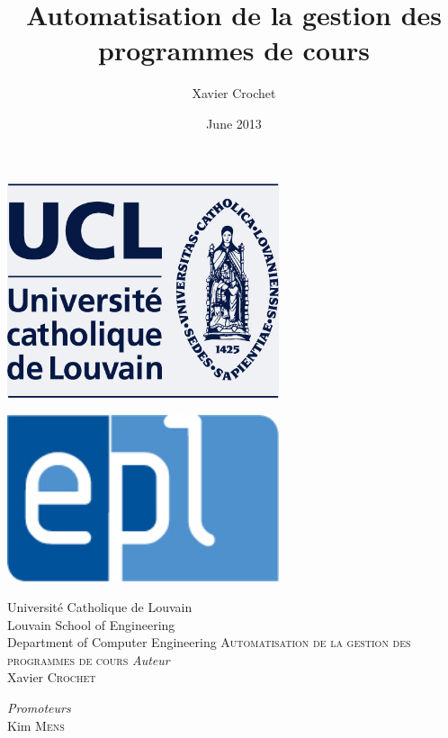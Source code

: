 \author{Xavier Crochet}
\title{Automatisation de la gestion des programmes de cours}
\date{June 2013}
\frontmatter
\begin{titlepage}
\begin{center}
\begin{minipage}{0.4\textwidth}
\begin{flushleft} \large
\includegraphics[width=0.6\textwidth]{ucl}
\end{flushleft}
\end{minipage}
\begin{minipage}{0.4\textwidth}
\begin{flushright}
\includegraphics[width=0.6\textwidth]{epl}
\end{flushright}
\end{minipage}
\vfill
Université Catholique de Louvain \\
Louvain School of Engineering \\
Department of Computer Engineering
\vfill
\textsc{\LARGE Automatisation de la gestion des programmes de cours}%
\vfill
\emph{Auteur}\\
\large{Xavier \textsc{Crochet}}
\vfill
\begin{minipage}{0.4\textwidth}
\begin{flushleft} \large
\emph{Promoteurs}\\Kim \textsc{Mens}\\

\end{flushleft}
\end{minipage}
\end{center}
\end{titlepage}
